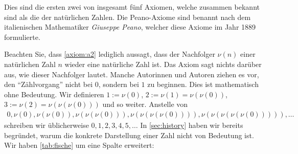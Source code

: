 \noindent
Dies sind die ersten zwei von insgesamt fünf Axiomen, welche zusammen bekannt sind als die  der natürlichen Zahlen. Die Peano-Axiome sind benannt nach dem italienischen Mathematiker \textit{Giuseppe Peano}, welcher diese Axiome im Jahr 1889 formulierte.

\bemerkungen{-}{}
{Beachten Sie, dass \cref{axiom:a2} lediglich aussagt, dass der Nachfolger $\nu(n)$ einer natürlichen Zahl $n$ wieder eine natürliche Zahl ist. Das Axiom sagt nichts darüber aus, wie dieser Nachfolger lautet.}
{Manche Autorinnen und Autoren ziehen es vor, den \enquote{Zählvorgang} nicht bei $0$, sondern bei $1$ zu beginnen. Dies ist mathematisch ohne Bedeutung. \cite{AmannEscher1}}
{Wir definieren $1:=\nu(0)$, $2:=\nu(1)=\nu(\nu(0))$, $3:=\nu(2)=\nu(\nu(\nu(0)))$ und so weiter. Anstelle von
\begin{align*}
    0, \nu(0), \nu(\nu(0)), \nu(\nu(\nu(0))), \nu(\nu(\nu(\nu(0)))), \nu(\nu(\nu(\nu(\nu(0))))), \ldots
\end{align*}
schreiben wir üblicherweise $0, 1, 2, 3, 4, 5, \ldots$
}
In \cref{sec:history} haben wir bereits begründet, warum die konkrete Darstellung einer Zahl nicht von Bedeutung ist. Wir haben \cref{tab:fische} um eine Spalte erweitert:
